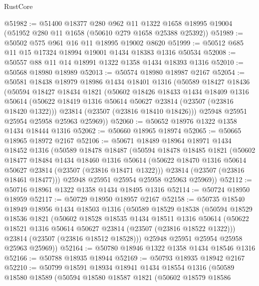 \begin{lexlean}{RustCore}
\begin{coremodule}
@51982 := @51400
    @18377
    @280
    @962
    @11
    @1322
    @1658
    @18995
    @19004
    (@51952 @280 @11 @1658 (@50610 @279 @1658 @25388 @25392))
@51989 := @50502 @575 @961 @16 @11 @18995 @19002 @8620
@51999 := @50512 @685 @11 @15 @17324 @18994 @19001 @1434 @18383 @1316 @50534
@52008 := @50557 @88 @11 @14 @18991 @1322 @1358 @1434 @18393 @1316
@52010 := @50568 @18980 @18989
@52013 := @50574 @18980 @18987 @2167
@52054 := @50581
    @18438
    @18979
    @18986
    @1434
    @18401
    @1316
    (@50589
      @18427
      @18436
      (@50594
        @18427
        @18434
        @1821
        (@50602
          @18426
          @18433
          @1434
          @18409
          @1316
          @50614
          (@50622 @18419 @1316 @50614 @50627 @23814 (@23507 (@23816 @18420 @1322)))
          @23814
          (@23507 (@23816 @18410 @18426)))
        @25948
        @25951
        @25954
        @25958
        @25963
        @25969))
@52060 := @50652 @18976 @1322 @1358 @1434 @18444 @1316
@52062 := @50660 @18965 @18974
@52065 := @50665 @18965 @18972 @2167
@52106 := @50671
    @18489
    @18964
    @18971
    @1434
    @18452
    @1316
    (@50589
      @18478
      @18487
      (@50594
        @18478
        @18485
        @1821
        (@50602
          @18477
          @18484
          @1434
          @18460
          @1316
          @50614
          (@50622 @18470 @1316 @50614 @50627 @23814 (@23507 (@23816 @18471 @1322)))
          @23814
          (@23507 (@23816 @18461 @18477)))
        @25948
        @25951
        @25954
        @25958
        @25963
        @25969))
@52112 := @50716 @18961 @1322 @1358 @1434 @18495 @1316
@52114 := @50724 @18950 @18959
@52117 := @50729 @18950 @18957 @2167
@52158 := @50735
    @18540
    @18949
    @18956
    @1434
    @18503
    @1316
    (@50589
      @18529
      @18538
      (@50594
        @18529
        @18536
        @1821
        (@50602
          @18528
          @18535
          @1434
          @18511
          @1316
          @50614
          (@50622 @18521 @1316 @50614 @50627 @23814 (@23507 (@23816 @18522 @1322)))
          @23814
          (@23507 (@23816 @18512 @18528)))
        @25948
        @25951
        @25954
        @25958
        @25963
        @25969))
@52164 := @50780 @18946 @1322 @1358 @1434 @18546 @1316
@52166 := @50788 @18935 @18944
@52169 := @50793 @18935 @18942 @2167
@52210 := @50799
    @18591
    @18934
    @18941
    @1434
    @18554
    @1316
    (@50589
      @18580
      @18589
      (@50594
        @18580
        @18587
        @1821
        (@50602
          @18579
          @18586

\end{coremodule}
\end{lexlean}

